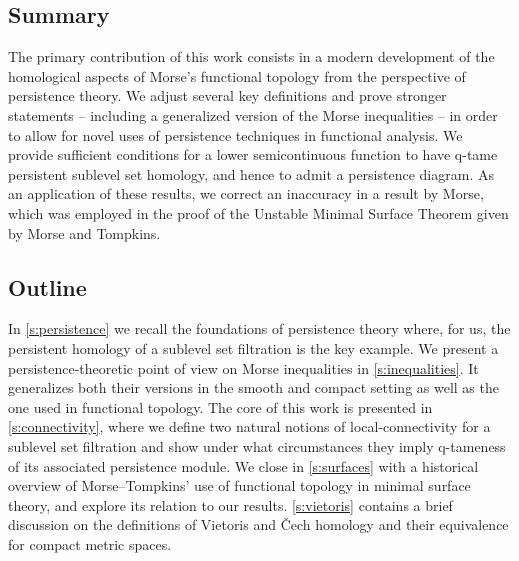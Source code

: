 \subsection*{Summary}

The primary contribution of this work consists in a modern development of the homological aspects of Morse's functional topology from the perspective of persistence theory.
We adjust several key definitions and prove stronger statements -- including a generalized version of the Morse inequalities -- in order to allow for novel uses of persistence techniques in functional analysis.
We provide sufficient conditions for a lower semicontinuous function to have q-tame persistent sublevel set homology, and hence to admit a persistence diagram.
As an application of these results, we correct an inaccuracy in a result by Morse, which was employed in the proof of the Unstable Minimal Surface Theorem given by Morse and Tompkins.


\subsection*{Outline}

In \cref{s:persistence} we recall the foundations of persistence theory where, for us, the persistent homology of a sublevel set filtration is the key example.
We present a persistence-theoretic point of view on Morse inequalities in \cref{s:inequalities}.
It generalizes both their versions in the smooth and compact setting as well as the one used in functional topology.
The core of this work is presented in \cref{s:connectivity}, where we define two natural notions of local-connectivity for a sublevel set filtration and show under what circumstances they imply q-tameness of its associated persistence module.
We close in \cref{s:surfaces} with a historical overview of Morse--Tompkins' use of functional topology in minimal surface theory, and explore its relation to our results.
\cref{s:vietoris} contains a brief discussion on the definitions of Vietoris and \v{C}ech homology and their equivalence for compact metric spaces.
